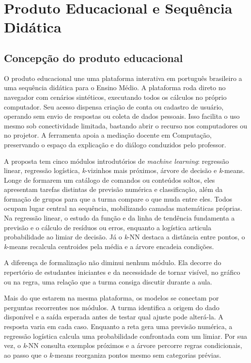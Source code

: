 \chapter{Produto Educacional e Sequência Didática}

\section{Concepção do produto educacional}

O produto educacional une uma plataforma interativa em português brasileiro a uma sequência didática para o Ensino Médio. A plataforma roda direto no navegador com cenários sintéticos, executando todos os cálculos no próprio computador. Seu acesso dispensa criação de conta ou cadastro de usuário, operando sem envio de respostas ou coleta de dados pessoais. Isso facilita o uso mesmo sob conectividade limitada, bastando abrir o recurso nos computadores ou no projetor. A ferramenta apoia a mediação docente em Computação, preservando o espaço da explicação e do diálogo conduzidos pelo professor.

A proposta tem cinco módulos introdutórios de \textit{machine learning}: regressão linear, regressão logística, \textit{k}-vizinhos mais próximos, árvore de decisão e \textit{k}-means. Longe de formarem um catálogo de comandos ou conteúdos soltos, eles apresentam tarefas distintas de previsão numérica e classificação, além da formação de grupos para que a turma compare o que muda entre eles. Todos ocupam lugar central na sequência, mobilizando camadas matemáticas próprias. Na regressão linear, o estudo da função e da linha de tendência fundamenta a previsão e o cálculo de resíduos ou erros, enquanto a logística articula probabilidade ao limiar de decisão. Já o \textit{k}-NN destaca a distância entre pontos, o \textit{k}-means recalcula centroides pela média e a árvore encadeia condições.

A diferença de formalização não diminui nenhum módulo. Ela decorre do repertório de estudantes iniciantes e da necessidade de tornar visível, no gráfico ou na regra, uma relação que a turma consiga discutir durante a aula.

Mais do que estarem na mesma plataforma, os modelos se conectam por perguntas recorrentes nos módulos. A turma identifica a origem do dado disponível e a saída esperada antes de testar qual ajuste pode alterá-la. A resposta varia em cada caso. Enquanto a reta gera uma previsão numérica, a regressão logística calcula uma probabilidade confrontada com um limiar. Por sua vez, o \textit{k}-NN consulta exemplos próximos e a árvore percorre regras condicionais, ao passo que o \textit{k}-means reorganiza pontos mesmo sem categorias prévias.

